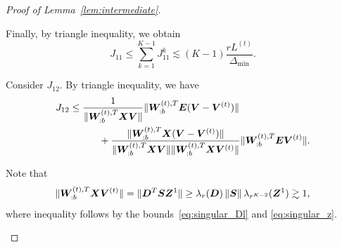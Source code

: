 \documentclass[lettersize,journal]{IEEEtran}
\theoremstyle{definition}
\theoremstyle{definition}
\newcommand{\offf}[1]{\left\{#1\right\}}
\def\fixme#1#2{\textbf{\color{red}[FIXME (#1): #2]}}
\begin{document}
\begin{proof}[Proof of Lemma~\ref{lem:intermediate}]
\begin{enumerate}
    
    Finally, by triangle inequality, we obtain
    \begin{equation}\label{eq:j1}
        J_{11} \leq \sum_{k = 1}^{K-1} J_{11}^k \lesssim (K-1)\frac{r L^{(t)}}{\Delta_{\min}}.
    \end{equation}
    
    
    Consider $J_{12}$. By triangle inequality, we have 
    \begin{align}
        J_{12} &\leq \frac{ 1}{\lVert\bm{W}_{:b}^{(t),T} \bm X \bm{V} \rVert} \lVert\bm{W}_{:b}^{(t),T} \bm{E} (\bm{V}-\bm{V}^{(t)})\rVert \\ &\quad \quad \quad  +
        \frac{ \lVert\bm{W}_{:b}^{(t),T} \bm X (\bm{V}-\bm{V}^{(t)})\rVert }{\lVert\bm{W}_{:b}^{(t),T} \bm X \bm{V} \rVert\lVert\bm{W}_{:b}^{(t),T} \bm X \bm{V}^{(t)} \rVert} \lVert\bm{W}_{:b}^{(t),T} \bm{E} \bm{V}^{(t)} \rVert.
    \end{align}

     Note that 
    \begin{equation}\label{eq:j11_wxvt}
       \onormSize{}{\mW_{:b}^{(t),T} \mX \mV^{(t)}} = \onormSize{}{\mD^T \mS \mZ^1} \geq \lambda_r(\mD) \onorm{\mS} \lambda_{r^{K-2}}(\mZ^1) \gtrsim 1,
    \end{equation}
    where inequality follows by the bounds~\eqref{eq:singular_Dl} and \eqref{eq:singular_z}.
    

\end{enumerate}
\end{proof}
\end{document}
